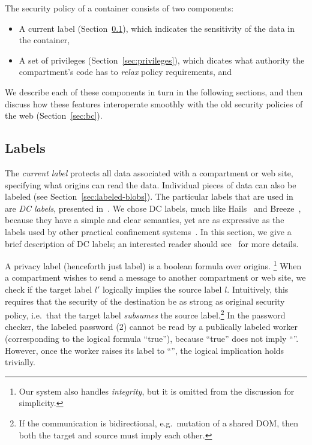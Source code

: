 The security policy of a container consists of two components:

\begin{itemize}
    \item A current label (Section~\ref{sec:labels}), which indicates the
        sensitivity of the data in the container,
    \item A set of privileges (Section~\ref{sec:privileges}), which
        dicates what authority the compartment's code has to
        \emph{relax} policy requirements, and
\end{itemize}

We describe each of these components in turn in the following sections,
and then discuss how these features interoperate smoothly with the old
security policies of the web (Section~\ref{sec:bc}).

\subsection{Labels}
\label{sec:labels}

The \emph{current label} protects all data associated with a compartment or
web site, specifying what origins can read the data.
%
Individual pieces of data can also be labeled (see Section~\ref{sec:labeled-blobs}).
%
The particular labels that are used in \sys{} are \emph{DC labels},
presented in~\cite{stefan:2011:dclabels}.
%
We chose DC labels, much like Hails~\cite{giffin:2012:hails} and
Breeze~\cite{Breeze13}, because they have a simple and clear
semantics, yet are as expressive as the labels used by other practical
confinement systems~\cite{GenLabels}.
%
In this section, we give a brief description of DC labels; an interested
reader should see~\cite{stefan:2011:dclabels} for more details.

A privacy label (henceforth just label) is a boolean formula over
origins.%
%
\footnote{
  Our system also handles \emph{integrity}, but it is omitted from
  the discussion for simplicity.
}
%
When a compartment wishes to send a message to another compartment or
web site, we check if the target label $l'$ logically implies the source
label $l$.
%
Intuitively, this requires that the security of the destination be as strong as original security policy, i.e.\ that the target label \emph{subsumes} the source label.\footnote{If the communication is bidirectional, e.g.\ mutation of a shared DOM, then both the target and source must imply each other.}
%
In the password checker, the labeled password (2) cannot be read by a
publically labeled worker (corresponding to the logical formula
``true''), because ``true'' does not imply ``''.
%
However, once the worker raises its label to ``'', the
logical implication holds trivially.

